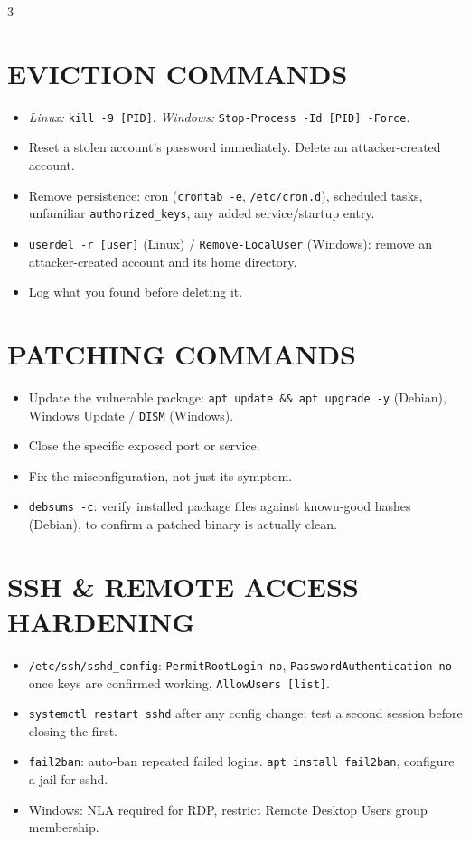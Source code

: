 \documentclass[7pt,landscape]{article}
\begin{document}
\begin{multicols*}{3}
\section{EVICTION COMMANDS}
\begin{itemize}
    \item \textit{\textcolor{linuxc}{Linux:}} \texttt{kill -9 [PID]}. \textit{\textcolor{winc}{Windows:}} \texttt{Stop-Process -Id [PID] -Force}.
    \item Reset a stolen account's password immediately. Delete an attacker-created account.
    \item Remove persistence: cron (\texttt{crontab -e}, \texttt{/etc/cron.d}), scheduled tasks, unfamiliar \texttt{authorized\_keys}, any added service/startup entry.
    \item \texttt{userdel -r [user]} \textcolor{linuxc}{(Linux)} / \texttt{Remove-LocalUser} \textcolor{winc}{(Windows)}: remove an attacker-created account and its home directory.
    \item Log what you found before deleting it.
\end{itemize}

\section{PATCHING COMMANDS}
\begin{itemize}
    \item Update the vulnerable package: \texttt{apt update \&\& apt upgrade -y} \textcolor{linuxc}{(Debian)}, Windows Update / \texttt{DISM} \textcolor{winc}{(Windows)}.
    \item Close the specific exposed port or service.
    \item Fix the misconfiguration, not just its symptom.
    \item \texttt{debsums -c}: verify installed package files against known-good hashes \textcolor{linuxc}{(Debian)}, to confirm a patched binary is actually clean.
\end{itemize}

\section{SSH \& REMOTE ACCESS HARDENING}
\begin{itemize}
    \item \texttt{/etc/ssh/sshd\_config}: \texttt{PermitRootLogin no}, \texttt{PasswordAuthentication no} once keys are confirmed working, \texttt{AllowUsers [list]}.
    \item \texttt{systemctl restart sshd} after any config change; test a second session before closing the first.
    \item \texttt{fail2ban}: auto-ban repeated failed logins. \texttt{apt install fail2ban}, configure a jail for sshd.
    \item \textcolor{winc}{Windows}: NLA required for RDP, restrict Remote Desktop Users group membership.
\end{itemize}


\end{multicols*}
\end{document}
